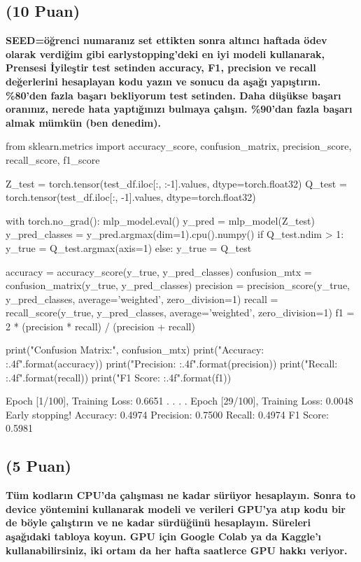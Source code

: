 \documentclass[11pt]{article}
\begin{document}
\subsection{(10 Puan)} \textbf{SEED=öğrenci numaranız set ettikten sonra altıncı haftada ödev olarak verdiğim gibi earlystopping'deki en iyi modeli kullanarak, Prensesi İyileştir test setinden accuracy, F1, precision ve recall değerlerini hesaplayan kodu yazın ve sonucu da aşağı yapıştırın. \%80'den fazla başarı bekliyorum test setinden. Daha düşükse başarı oranınız, nerede hata yaptığınızı bulmaya çalışın. \%90'dan fazla başarı almak mümkün (ben denedim).}

\begin{python}
from sklearn.metrics import accuracy_score, confusion_matrix, precision_score, recall_score, f1_score

Z_test = torch.tensor(test_df.iloc[:, :-1].values, dtype=torch.float32)
Q_test = torch.tensor(test_df.iloc[:, -1].values, dtype=torch.float32)

with torch.no_grad():
    mlp_model.eval()
    y_pred = mlp_model(Z_test)
    y_pred_classes = y_pred.argmax(dim=1).cpu().numpy()
    if Q_test.ndim > 1:
        y_true = Q_test.argmax(axis=1)
    else:
        y_true = Q_test

accuracy = accuracy_score(y_true, y_pred_classes)
confusion_mtx = confusion_matrix(y_true, y_pred_classes)
precision = precision_score(y_true, y_pred_classes, average='weighted', zero_division=1)
recall = recall_score(y_true, y_pred_classes, average='weighted', zero_division=1)
f1 = 2 * (precision * recall) / (precision + recall)

print("Confusion Matrix:\n", confusion_mtx)
print("Accuracy: {:.4f}".format(accuracy))
print("Precision: {:.4f}".format(precision))
print("Recall: {:.4f}".format(recall))
print("F1 Score: {:.4f}".format(f1))


\end{python}

Epoch [1/100], Training Loss: 0.6651
.
.
.
.
Epoch [29/100], Training Loss: 0.0048
Early stopping!
Accuracy: 0.4974
Precision: 0.7500
Recall: 0.4974
F1 Score: 0.5981

\subsection{(5 Puan)} \textbf{Tüm kodların CPU'da çalışması ne kadar sürüyor hesaplayın. Sonra to device yöntemini kullanarak modeli ve verileri GPU'ya atıp kodu bir de böyle çalıştırın ve ne kadar sürdüğünü hesaplayın. Süreleri aşağıdaki tabloya koyun. GPU için Google Colab ya da Kaggle'ı kullanabilirsiniz, iki ortam da her hafta saatlerce GPU hakkı veriyor.}
\end{document}
